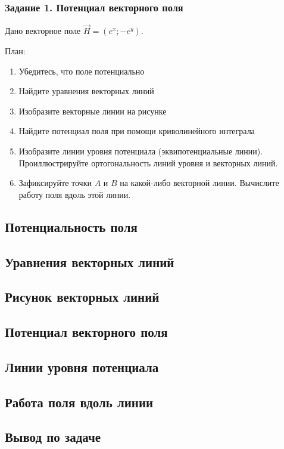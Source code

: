 \begin{frame}\frametitle{Задание 1. Потенциал векторного поля}
	Дано векторное поле \( \vec H = \left( e^x; -e^y \right) \).

	План:
	\begin{enumerate}
		\item Убедитесь, что поле потенциально
		\item Найдите уравнения векторных линий
		\item Изобразите векторные линии на рисунке
		\item Найдите потенциал поля при помощи криволинейного интеграла
		\item Изобразите линии уровня потенциала (эквипотенциальные линии).
		      Проиллюстрируйте ортогональность линий уровня и векторных линий.
		\item Зафиксируйте точки \( A \) и \( B \) на какой-либо векторной линии.
		      Вычислите работу поля вдоль этой линии.
	\end{enumerate}
\end{frame}

\subsection{Потенциальность поля}

\subsection{Уравнения векторных линий}

\subsection{Рисунок векторных линий}

\subsection{Потенциал векторного поля}

\subsection{Линии уровня потенциала}

\subsection{Работа поля вдоль линии}

\subsection{Вывод по задаче}

